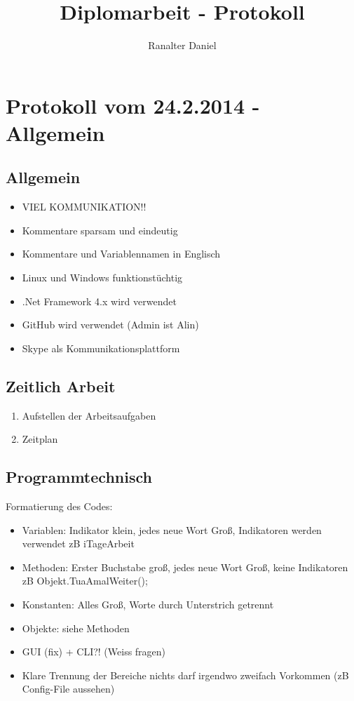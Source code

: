 \documentclass[10pt,a4paper]{report}
\title{Diplomarbeit - Protokoll}
\author{Ranalter Daniel}
\begin{document}
\maketitle
\tableofcontents
\chapter{Protokoll vom 24.2.2014 - Allgemein}
\section{Allgemein}
\begin{itemize}
\item VIEL KOMMUNIKATION!!
\item Kommentare sparsam und eindeutig
\item Kommentare und Variablennamen in Englisch 
\item Linux und Windows funktionstüchtig
\item .Net Framework 4.x wird verwendet
\item GitHub wird verwendet (Admin ist Alin)
\item Skype als Kommunikationsplattform
\end{itemize}
\section{Zeitlich Arbeit}
\begin{enumerate}
\item Aufstellen der Arbeitsaufgaben 
\item Zeitplan 
\end{enumerate}
\section{Programmtechnisch}
Formatierung des Codes:
\begin{itemize}
\item Variablen: Indikator klein, jedes neue Wort Groß, Indikatoren werden verwendet zB iTageArbeit
\item Methoden: Erster Buchstabe groß, jedes neue Wort Groß, keine Indikatoren zB Objekt.TuaAmalWeiter();
\item Konstanten: Alles Groß, Worte durch Unterstrich getrennt
\item Objekte: siehe Methoden
\item GUI (fix) + CLI?! (Weiss fragen)
\item Klare Trennung der Bereiche nichts darf irgendwo zweifach Vorkommen (zB Config-File aussehen)
\end{itemize}
\end{document}
